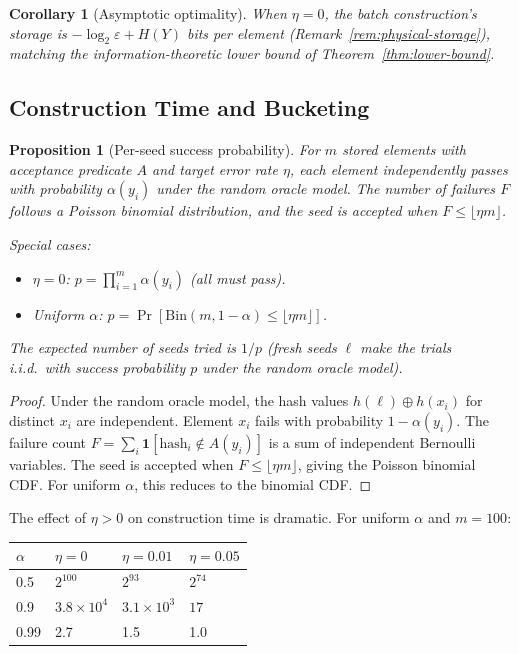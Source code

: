 \documentclass[11pt]{article}
\theoremstyle{definition}
\theoremstyle{plain}
\newtheorem{corollary}[theorem]{Corollary}
\newtheorem{proposition}[theorem]{Proposition}
\theoremstyle{remark}
\begin{document}
\begin{corollary}[Asymptotic optimality]
When $\eta = 0$, the batch construction's storage is
$-\log_2 \varepsilon + H(Y)$ bits per element
(Remark~\ref{rem:physical-storage}), matching the information-theoretic
lower bound of Theorem~\ref{thm:lower-bound}.
\end{corollary}

\subsection{Construction Time and Bucketing}
\label{subsec:tractability}

\begin{proposition}[Per-seed success probability]
\label{prop:construction-time}
For $m$ stored elements with acceptance predicate $A$ and target error rate
$\eta$, each element independently passes with probability $\alpha(y_i)$
under the random oracle model.  The number of failures $F$ follows a
Poisson binomial distribution, and the seed is accepted when
$F \leq \lfloor \eta m \rfloor$.

\emph{Special cases:}
\begin{itemize}
\item $\eta = 0$: $p = \prod_{i=1}^m \alpha(y_i)$ (all must pass).
\item Uniform $\alpha$:
    $p = \Pr[\mathrm{Bin}(m, 1-\alpha) \leq \lfloor \eta m \rfloor]$.
\end{itemize}
The expected number of seeds tried is $1/p$ (fresh seeds $\ell$ make the
trials i.i.d.\ with success probability $p$ under the random oracle
model).
\end{proposition}

\begin{proof}
Under the random oracle model, the hash values $h(\ell) \oplus h(x_i)$ for
distinct $x_i$ are independent.  Element $x_i$ fails with probability
$1 - \alpha(y_i)$.  The failure count $F = \sum_i \mathbf{1}[\text{hash}_i
\notin A(y_i)]$ is a sum of independent Bernoulli variables.  The seed
is accepted when $F \leq \lfloor \eta m \rfloor$, giving the Poisson
binomial CDF.  For uniform $\alpha$, this reduces to the binomial CDF.
\end{proof}

The effect of $\eta > 0$ on construction time is dramatic.  For uniform
$\alpha$ and $m = 100$:

\begin{center}
\begin{tabular}{@{}llll@{}}
\toprule
$\alpha$ & $\eta = 0$ & $\eta = 0.01$ & $\eta = 0.05$ \\
\midrule
0.5 & $2^{100}$ & $2^{93}$ & $2^{74}$ \\
0.9 & $3.8 \times 10^4$ & $3.1 \times 10^3$ & $17$ \\
0.99 & 2.7 & 1.5 & 1.0 \\
\bottomrule
\end{tabular}
\end{center}
\end{document}
